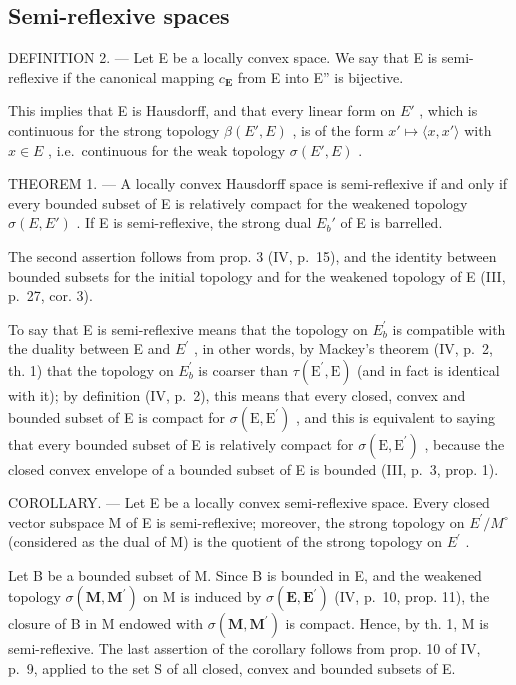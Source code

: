 \subsection{Semi-reflexive spaces}

DEFINITION 2. --- Let E be a locally convex space. We say that E is semi-reflexive if the canonical mapping \(c_{\mathbf{E}}\) from E into E'' is bijective.

This implies that E is Hausdorff, and that every linear form on \(E'\) , which is continuous for the strong topology \(\beta(E', E)\) , is of the form \(x' \mapsto \langle x, x' \rangle\) with \(x \in E\) , i.e.~continuous for the weak topology \(\sigma(E', E)\) .

THEOREM 1. --- A locally convex Hausdorff space is semi-reflexive if and only if every bounded subset of E is relatively compact for the weakened topology \(\sigma(E, E')\) . If E is semi-reflexive, the strong dual \(E_b'\) of E is barrelled.

The second assertion follows from prop. 3 (IV, p.~15), and the identity between bounded subsets for the initial topology and for the weakened topology of E (III, p.~27, cor. 3).

To say that E is semi-reflexive means that the topology on \(E_{b}^{\prime}\) is compatible with the duality between E and \(E^{\prime}\) , in other words, by Mackey's theorem (IV, p.~2, th. 1) that the topology on \(E_{b}^{\prime}\) is coarser than \(\tau(\mathrm{E}^{\prime}, \mathrm{E})\) (and in fact is identical with it); by definition (IV, p.~2), this means that every closed, convex and bounded subset of E is compact for \(\sigma(\mathrm{E}, \mathrm{E}^{\prime})\) , and this is equivalent to saying that every bounded subset of E is relatively compact for \(\sigma(\mathrm{E},\mathrm{E}^{\prime})\) , because the closed convex envelope of a bounded subset of E is bounded (III, p.~3, prop. 1).

COROLLARY. --- Let E be a locally convex semi-reflexive space. Every closed vector subspace M of E is semi-reflexive; moreover, the strong topology on \(E^{\prime}/M^{\circ}\) (considered as the dual of M) is the quotient of the strong topology on \(E^{\prime}\) .

Let B be a bounded subset of M. Since B is bounded in E, and the weakened topology \(\sigma(\mathbf{M},\mathbf{M}^{\prime})\) on M is induced by \(\sigma(\mathbf{E},\mathbf{E}^{\prime})\) (IV, p.~10, prop. 11), the closure of B in M endowed with \(\sigma(\mathbf{M},\mathbf{M}^{\prime})\) is compact. Hence, by th. 1, M is semi-reflexive. The last assertion of the corollary follows from prop. 10 of IV, p.~9, applied to the set S of all closed, convex and bounded subsets of E.

